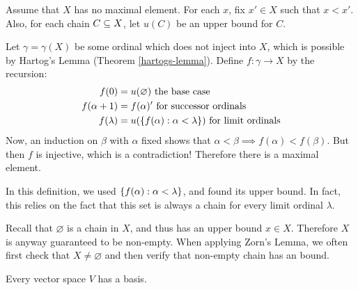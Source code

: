 \documentclass{article}
\begin{document}
\begin{prf}
    Assume that $X$ has no maximal element. For each $x$, fix $x' \in X$ such that $x < x'$. Also, for each chain $C \subseteq X$, let $u(C)$ be an upper bound for $C$.
    
    Let $\gamma = \gamma(X)$ be some ordinal which does not inject into $X$, which is possible by Hartog's Lemma (Theorem \ref{hartogs-lemma}). Define $f : \gamma \to X$ by the recursion:
    \begin{align*}
    	f(0) &= u(\varnothing) \text{ the base case} \\
    	f(\alpha + 1) &= f(\alpha)' \text{ for successor ordinals}\\
    	f(\lambda) &= u(\left\lbrace f(\alpha) : \alpha < \lambda \right\rbrace) \text{ for limit ordinals}
	\end{align*}
	Now, an induction on $\beta$ with $\alpha$ fixed shows that $\alpha < \beta \implies f(\alpha) < f(\beta)$. But then $f$ is injective, which is a contradiction! Therefore there is a maximal element.
	
	In this definition, we used $\left\lbrace f(\alpha) : \alpha < \lambda \right\rbrace$, and found its upper bound. In fact, this relies on the fact that this set is always a chain for every limit ordinal $\lambda$.
\end{prf}

\begin{note}
	Recall that $\varnothing$ is a chain in $X$, and thus has an upper bound $x \in X$. Therefore $X$ is anyway guaranteed to be non-empty. When applying Zorn's Lemma, we often first check that $X \neq \varnothing$ and then verify that non-empty chain has an bound.
\end{note}

\begin{theorem}
    Every vector space $V$ has a basis.
\end{theorem}
\end{document}
